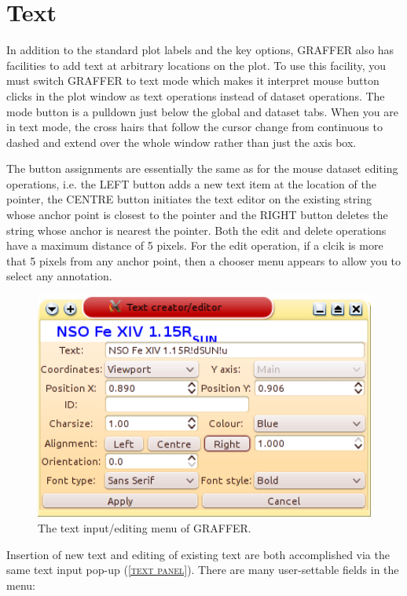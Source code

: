 \documentclass[11pt,twoside,english]{article}
\begin{document}
\section{Text}
\label{sec:text}

In addition to the standard plot labels and the key options, GRAFFER
also has facilities to add text at arbitrary locations on the plot.  To
use this facility, you must switch GRAFFER to text mode which makes it
interpret mouse button clicks in the plot window as text operations
instead of dataset operations. The mode button is a pulldown just below
the global and dataset tabs.  When you are in text mode, the cross
hairs that follow the cursor change from continuous to dashed and
extend over the whole window rather than just the axis box.

The button assignments are essentially the same as for the mouse
dataset editing operations, i.e. the LEFT button adds a new text item
at the location of the pointer, the CENTRE button initiates the text
editor on the existing string whose anchor point is closest to the
pointer and the RIGHT button deletes the string whose anchor is nearest
the pointer. Both the edit and delete operations have a maximum
distance of 5 pixels. For the edit operation, if a clcik is more that 5
pixels from any anchor point, then a chooser menu appears to allow you
to select any annotation.

\begin{figure}[htbp]
  \centering
  \includegraphics[width=12cm]{Text}
  \caption{The text input/editing menu of GRAFFER.}
  \label{text panel}
\end{figure}
Insertion of new text and editing of existing text are both
accomplished via the same text input pop-up (\textsc{\autoref{text
    panel}}). There are many user-settable fields in the menu:
\end{document}
